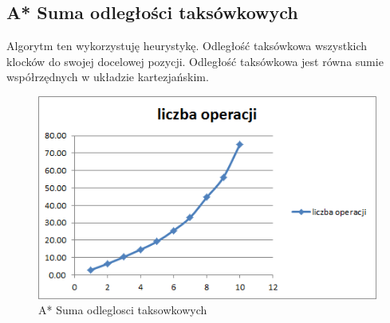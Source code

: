 \documentclass{classrep}
\begin{document}
\cleardoublepage
  \subsection{A* Suma odległości taksówkowych}
  Algorytm ten wykorzystuję heurystykę. Odległość taksówkowa wszystkich klocków do swojej docelowej pozycji. Odległość taksówkowa jest równa sumie współrzędnych w układzie kartezjańskim.
  
\begin{table}
\centering
{}
\caption{A* Suma odleglosci taksowkowych}
\end{table}

\begin{figure}[ht]
\centering
			\includegraphics[scale=0.65]{pictures/A3_operacje.png}
	\caption{A* Suma odleglosci taksowkowych}
	\label{fig:A* Suma odleglosci taksowkowych}
\end{figure}
\end{document}
